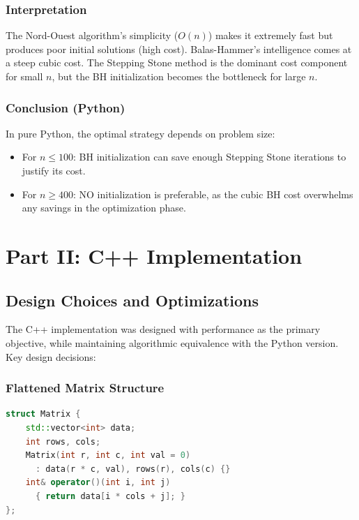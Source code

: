 \documentclass[12pt,a4paper]{article}
\begin{document}
\subsubsection{Interpretation}

The Nord-Ouest algorithm's simplicity ($O(n)$) makes it extremely fast but produces poor initial solutions (high cost). Balas-Hammer's intelligence comes at a steep cubic cost. The Stepping Stone method is the dominant cost component for small $n$, but the BH initialization becomes the bottleneck for large $n$.

\subsubsection{Conclusion (Python)}

In pure Python, the optimal strategy depends on problem size:
\begin{itemize}
  \item For $n \leq 100$: BH initialization can save enough Stepping Stone iterations to justify its cost.
  \item For $n \geq 400$: NO initialization is preferable, as the cubic BH cost overwhelms any savings in the optimization phase.
\end{itemize}

\newpage
\section{Part II: C++ Implementation}

\subsection{Design Choices and Optimizations}

The C++ implementation was designed with performance as the primary objective, while maintaining algorithmic equivalence with the Python version. Key design decisions:

\subsubsection{Flattened Matrix Structure}

\begin{lstlisting}[language=C++, caption={Cache-friendly matrix structure}]
struct Matrix {
    std::vector<int> data;
    int rows, cols;
    Matrix(int r, int c, int val = 0)
      : data(r * c, val), rows(r), cols(c) {}
    int& operator()(int i, int j)
      { return data[i * cols + j]; }
};
\end{lstlisting}
\end{document}
